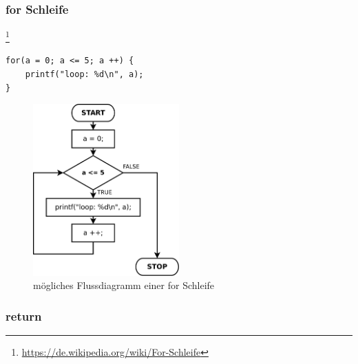 \newpage
\subsubsection{for Schleife}

\footnote{\url{https://de.wikipedia.org/wiki/For-Schleife}}


\begin{lstlisting}[language=CMM]
for(a = 0; a <= 5; a ++) {
	printf("loop: %d\n", a);
}
\end{lstlisting}

\begin{figure}[h]
\centering
\includegraphics[width=0.5\textwidth]{./media/images/compiler/language_specification_for.png}
\caption{m\"ogliches Flussdiagramm einer for Schleife}
\label{language_specification_for}
\end{figure}

\subsubsection{return}